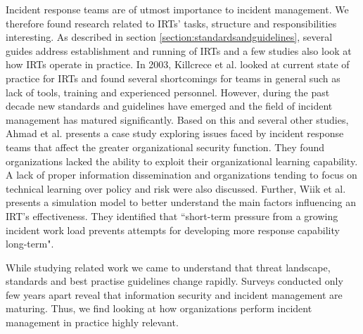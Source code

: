 Incident response teams are of utmost importance to incident management. We therefore found research related to \acp{IRT}' tasks, structure and responsibilities interesting. As described in section \ref{section:standardsandguidelines}, several guides address establishment and running of \acp{IRT} and a few studies also look at how \acp{IRT} operate in practice. In 2003, Killcrece et al. \cite{killcrece2003state} looked at current state of practice for \acp{IRT} and found several shortcomings for teams in general such as lack of tools, training and experienced personnel. However, during the past decade new standards and guidelines have emerged and the field of incident management has matured significantly.  Based on this and several other studies, Ahmad et al. \cite{ahmad2012incident} presents a case study exploring issues faced by incident response teams that affect the greater organizational security function. They found organizations lacked the ability to exploit their organizational learning capability. A lack of proper information dissemination and organizations tending to focus on technical learning over policy and risk were also discussed. Further, Wiik et al. \cite{gonzalezlimits} presents a simulation model to better understand the main factors influencing an \ac{IRT}'s effectiveness. They identified that ``short-term pressure from a growing incident work load prevents attempts for developing more response capability long-term". 

While studying related work we came to understand that threat landscape, standards and best practise guidelines change rapidly. Surveys conducted only few years apart reveal that information security and incident management are maturing. Thus, we find looking at how organizations perform incident management in practice highly relevant. 

